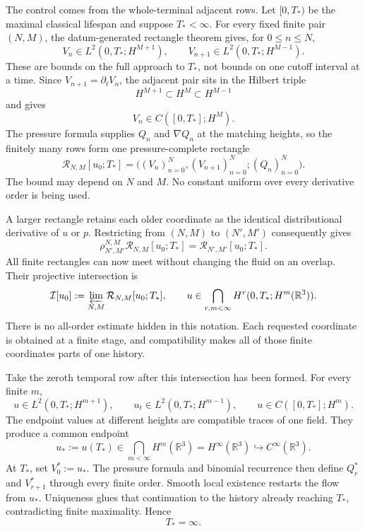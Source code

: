 The control comes from the whole-terminal adjacent rows.  Let
\([0,T_*)\) be the maximal classical lifespan and suppose \(T_*<\infty\).
For every fixed finite pair \((N,M)\), the datum-generated rectangle theorem
gives, for \(0\le n\le N\),
\[
 V_n\in L^2(0,T_*;H^{M+1}),
 \qquad
 V_{n+1}\in L^2(0,T_*;H^{M-1}).
\]
These are bounds on the full approach to \(T_*\), not bounds on one cutoff
interval at a time.  Since \(V_{n+1}=\partial_tV_n\), the adjacent pair sits in
the Hilbert triple
\[
 H^{M+1}\subset H^M\subset H^{M-1}
\]
and gives
\[
 V_n\in C([0,T_*];H^M).
\]
The pressure formula supplies \(Q_n\) and \(\nabla Q_n\) at the matching
heights, so the finitely many rows form one pressure-complete rectangle
\[
 \mathcal R_{N,M}[u_0;T_*]
 =\bigl((V_n)_{n=0}^{N},(V_{n+1})_{n=0}^{N};(Q_n)_{n=0}^{N}\bigr).
\]
The bound may depend on \(N\) and \(M\).  No constant uniform over every
derivative order is being used.

A larger rectangle retains each older coordinate as the identical
distributional derivative of \(u\) or \(p\).  Restricting from
\((N,M)\) to \((N',M')\) consequently gives
\[
 \rho_{N',M'}^{N,M}\mathcal R_{N,M}[u_0;T_*]
 =\mathcal R_{N',M'}[u_0;T_*].
\]
All finite rectangles can now meet without changing the fluid on an overlap.
Their projective intersection is
\[
 \mathcal I[u_0]
 :=\varprojlim_{N,M}\mathcal R_{N,M}[u_0;T_*],
 \qquad
 u\in\bigcap_{r,m<\infty}H^r(0,T_*;H^m(\mathbb R^3)).
\]
There is no all-order estimate hidden in this notation.  Each requested
coordinate is obtained at a finite stage, and compatibility makes all of
those finite coordinates parts of one history.

Take the zeroth temporal row after this intersection has been formed.  For
every finite \(m\),
\[
 u\in L^2(0,T_*;H^{m+1}),
 \qquad
 u_t\in L^2(0,T_*;H^{m-1}),
 \qquad
 u\in C([0,T_*];H^m).
\]
The endpoint values at different heights are compatible traces of one field.
They produce a common endpoint
\[
 u_*:=u(T_*)\in\bigcap_{m<\infty}H^m(\mathbb R^3)
 =H^\infty(\mathbb R^3)
 \hookrightarrow C^\infty(\mathbb R^3).
\]
At \(T_*\), set \(V_0^*:=u_*\).  The pressure formula and binomial recurrence
then define \(Q_r^*\) and \(V_{r+1}^*\) through every finite order.  Smooth
local existence restarts the flow from \(u_*\).  Uniqueness glues that
continuation to the history already reaching \(T_*\), contradicting finite
maximality.
Hence
\[
 T_*=\infty.
\]

